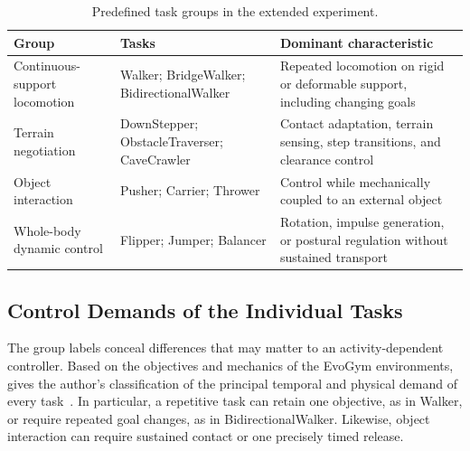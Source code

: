 \begin{table}[htbp]
  \centering
  \small
  \caption{Predefined task groups in the extended experiment.}
  \label{tab:extended-task-groups}
  \begin{tabularx}{\textwidth}{@{}>{\raggedright\arraybackslash}p{}>{\raggedright\arraybackslash}p{}>{\raggedright\arraybackslash}X@{}}
    \toprule
    Group & Tasks & Dominant characteristic \\
    \midrule
    Continuous-support locomotion & Walker; BridgeWalker; BidirectionalWalker & Repeated locomotion on rigid or deformable support, including changing goals \\
    Terrain negotiation & DownStepper; ObstacleTraverser; CaveCrawler & Contact adaptation, terrain sensing, step transitions, and clearance control \\
    Object interaction & Pusher; Carrier; Thrower & Control while mechanically coupled to an external object \\
    Whole-body dynamic control & Flipper; Jumper; Balancer & Rotation, impulse generation, or postural regulation without sustained transport \\
    \bottomrule
  \end{tabularx}
\end{table}

\subsection{Control Demands of the Individual Tasks}

The group labels conceal differences that may matter to an activity-dependent controller. Based on the objectives and mechanics of the EvoGym environments,  gives the author's classification of the principal temporal and physical demand of every task~\cite{bhatia2021evolution}. In particular, a repetitive task can retain one objective, as in Walker, or require repeated goal changes, as in BidirectionalWalker. Likewise, object interaction can require sustained contact or one precisely timed release.

